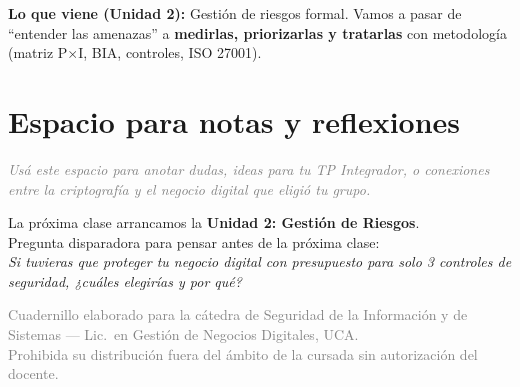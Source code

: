 \documentclass[12pt,a4paper]{article}
\begin{document}
\begin{cajaCierre}[title={Mapa de la Unidad 1}]
\vspace{6pt}
\textbf{Lo que viene (Unidad 2):} Gesti\'on de riesgos formal. Vamos a pasar de ``entender las amenazas'' a \textbf{medirlas, priorizarlas y tratarlas} con metodología (matriz P$\times$I, BIA, controles, ISO 27001).
\end{cajaCierre}

\newpage
\section{Espacio para notas y reflexiones}

\begin{tcolorbox}[colback=grisClaro, colframe=gray!50, arc=2mm, height=7cm]
\textcolor{gray}{\itshape Us\'a este espacio para anotar dudas, ideas para tu TP Integrador, o conexiones entre la criptograf\'ia y el negocio digital que eligi\'o tu grupo.}
\end{tcolorbox}

\vspace{12pt}

\begin{cajaConcepto}[title={Puente hacia la Clase 5}]
La pr\'oxima clase arrancamos la \textbf{Unidad 2: Gesti\'on de Riesgos}.\\[4pt]
Pregunta disparadora para pensar antes de la pr\'oxima clase:\\
\emph{Si tuvieras que proteger tu negocio digital con presupuesto para solo 3 controles de seguridad, ¿cu\'ales elegir\'ias y por qu\'e?}
\end{cajaConcepto}

\vfill
\begin{center}
\small\textcolor{gray}{%
Cuadernillo elaborado para la c\'atedra de Seguridad de la Informaci\'on y de
Sistemas --- Lic.\ en Gesti\'on de Negocios Digitales, UCA.\\
Prohibida su distribuci\'on fuera del \'ambito de la cursada sin autorizaci\'on del docente.}
\end{center}
\end{document}
